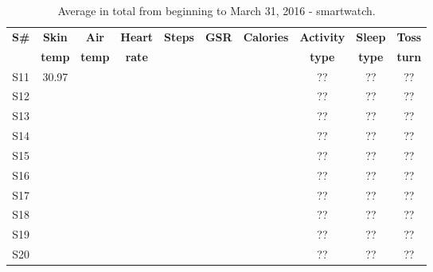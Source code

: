 \documentclass[12pt]{article} %
\begin{document}
\begin{table}[H]
\center
\begin{footnotesize}
	\begin{tabular}{| c | c | c | c | c | c | c | c | c | c |}
	\hline
	\textbf{S\#} & \textbf{Skin} & \textbf{Air} & \textbf{Heart} & \textbf{Steps} & \textbf{GSR} & \textbf{Calories} & \textbf{Activity} & \textbf{Sleep} & \textbf{Toss}\\
	 & \textbf{temp} & \textbf{temp} & \textbf{rate} & & & & \textbf{type} & \textbf{type} & \textbf{turn}\\
	
	\hline
	S11 & 30.97  &  &  &  &  &  & ?? & ?? & ??\\
	\hline
	S12 &  &  &  &  &  &  & ?? & ?? & ??\\
	\hline
	S13 &  &  &  &  &  &  & ?? & ?? & ??\\
	\hline
	S14 &  &  &  &  &  &  & ?? & ?? & ??\\
	\hline
	S15 &  &  &  &  &  &  & ?? & ?? & ??\\
	\hline
	S16 &  &  &  &  &  &  & ?? & ?? & ??\\
	\hline
	S17 &  &  &  &  &  &  & ?? & ?? & ??\\
	\hline
	S18 &  &  &  &  &  &  & ?? & ?? & ??\\
	\hline
	S19 &  &  &  &  &  &  & ?? & ?? & ??\\
	\hline
	S20 &  &  &  &  &  &  & ?? & ?? & ??\\
	\hline
	\end{tabular}
	\caption{Average in total from beginning to March 31, 2016 - smartwatch.}
	\label{tab:totalMinutesWatch}
\end{footnotesize}
\end{table}
\end{document}
